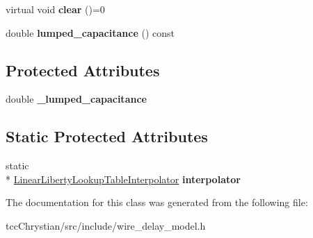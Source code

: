 \begin{DoxyCompactItemize}
\item 
\hypertarget{classWireDelayModel_a74869a3a66deb53507e8bc6f16eff45c}{virtual void {\bfseries clear} ()=0}\label{classWireDelayModel_a74869a3a66deb53507e8bc6f16eff45c}

\item 
\hypertarget{classWireDelayModel_a05f509843dfa07e17c9b6cc16ba9aaa0}{double {\bfseries lumped\-\_\-capacitance} () const }\label{classWireDelayModel_a05f509843dfa07e17c9b6cc16ba9aaa0}

\end{DoxyCompactItemize}
\subsection*{Protected Attributes}
\begin{DoxyCompactItemize}
\item 
\hypertarget{classWireDelayModel_ab03b1640710e81c9dcd4cbe9b7fed329}{double {\bfseries \-\_\-lumped\-\_\-capacitance}}\label{classWireDelayModel_ab03b1640710e81c9dcd4cbe9b7fed329}

\end{DoxyCompactItemize}
\subsection*{Static Protected Attributes}
\begin{DoxyCompactItemize}
\item 
\hypertarget{classWireDelayModel_aa8f767316492b902c13ec68651b30247}{static \\*
\hyperlink{classLinearLibertyLookupTableInterpolator}{Linear\-Liberty\-Lookup\-Table\-Interpolator} {\bfseries interpolator}}\label{classWireDelayModel_aa8f767316492b902c13ec68651b30247}

\end{DoxyCompactItemize}


The documentation for this class was generated from the following file\-:\begin{DoxyCompactItemize}
\item 
tcc\-Chrystian/src/include/wire\-\_\-delay\-\_\-model.\-h\end{DoxyCompactItemize}
